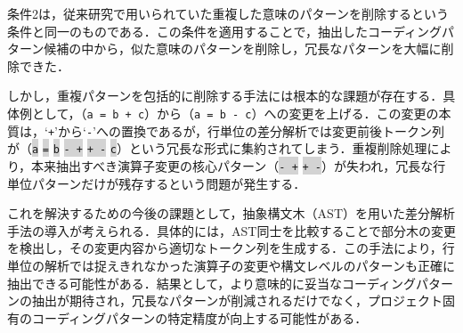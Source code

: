 \documentclass[11pt]{jreport}
\begin{document}
条件2は，従来研究で用いられていた重複した意味のパターンを削除するという条件と同一のものである．この条件を適用することで，抽出したコーディングパターン候補の中から，似た意味のパターンを削除し，冗長なパターンを大幅に削除できた．

しかし，重複パターンを包括的に削除する手法には根本的な課題が存在する．具体例として，（\texttt{a = b + c}）から（\texttt{a = b - c}）への変更を上げる．この変更の本質は，`\texttt{+}'から`\texttt{-}'への置換であるが，行単位の差分解析では変更前後トークン列が（\colorbox{lightgray}{\texttt{a}} \colorbox{lightgray}{\texttt{=}} \colorbox{lightgray}{\texttt{b}} \colorbox{lightgray}{\texttt{- +}} \colorbox{lightgray}{\texttt{+ -}} \colorbox{lightgray}{\texttt{c}}）という冗長な形式に集約されてしまう．重複削除処理により，本来抽出すべき演算子変更の核心パターン（\colorbox{lightgray}{\texttt{- +}} \colorbox{lightgray}{\texttt{+ -}}）が失われ，冗長な行単位パターンだけが残存するという問題が発生する．

これを解決するための今後の課題として，抽象構文木（AST）を用いた差分解析手法の導入が考えられる．具体的には，AST同士を比較することで部分木の変更を検出し，その変更内容から適切なトークン列を生成する．この手法により，行単位の解析では捉えきれなかった演算子の変更や構文レベルのパターンも正確に抽出できる可能性がある．結果として，より意味的に妥当なコーディングパターンの抽出が期待され，冗長なパターンが削減されるだけでなく，プロジェクト固有のコーディングパターンの特定精度が向上する可能性がある．
\end{document}
